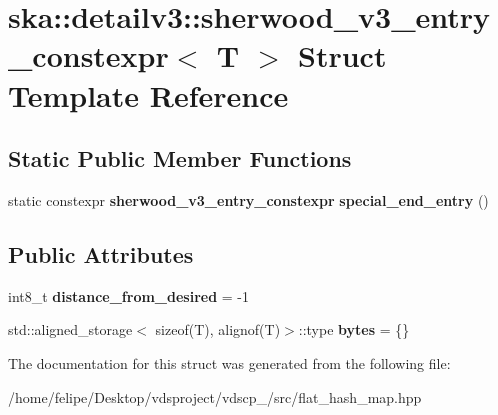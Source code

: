 \section{ska\+:\+:detailv3\+:\+:sherwood\+\_\+v3\+\_\+entry\+\_\+constexpr$<$ T $>$ Struct Template Reference}
\label{structska_1_1detailv3_1_1sherwood__v3__entry__constexpr}
\subsection*{Static Public Member Functions}
\begin{DoxyCompactItemize}
\item 
static constexpr {\bf sherwood\+\_\+v3\+\_\+entry\+\_\+constexpr} {\bfseries special\+\_\+end\+\_\+entry} ()\label{structska_1_1detailv3_1_1sherwood__v3__entry__constexpr_a8e108295e425fb09e7a4cc8996954416}

\end{DoxyCompactItemize}
\subsection*{Public Attributes}
\begin{DoxyCompactItemize}
\item 
int8\+\_\+t {\bfseries distance\+\_\+from\+\_\+desired} = -\/1\label{structska_1_1detailv3_1_1sherwood__v3__entry__constexpr_ae7768dcc0b6657c0d1dd9f1b83e11164}

\item 
std\+::aligned\+\_\+storage$<$ sizeof(T), alignof(T)$>$\+::type {\bfseries bytes} = \{\}\label{structska_1_1detailv3_1_1sherwood__v3__entry__constexpr_a73102676c8042d0baafcf97d57752d41}

\end{DoxyCompactItemize}


The documentation for this struct was generated from the following file\+:\begin{DoxyCompactItemize}
\item 
/home/felipe/\+Desktop/vdsproject/vdscp\+\_/src/flat\+\_\+hash\+\_\+map.\+hpp\end{DoxyCompactItemize}
